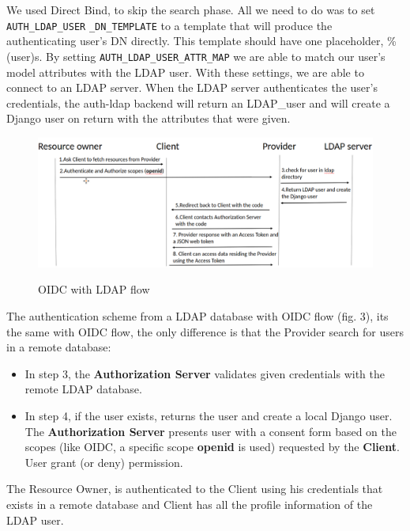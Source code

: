 We used Direct Bind, to skip the search phase. All we need to do was to set \verb|AUTH_LDAP_USER| \verb|_DN_TEMPLATE| to a template that will produce the authenticating user’s DN directly. This template should have one placeholder, \%(user)s. By setting \verb|AUTH_LDAP_USER_ATTR_MAP| we are able to match our user's model attributes with the LDAP user.
With these settings, we are able to connect to an LDAP server. When the LDAP server authenticates the user's credentials, the auth-ldap backend will return an LDAP\_user and will create a Django user on return with the attributes that were given.

\begin{figure}[htb]
	\centering
	\includegraphics[scale=0.3]{figures/LDAP.png}\\
	\caption{OIDC with LDAP flow}
\end{figure}

The authentication scheme from a LDAP database with OIDC flow (fig. 3), its the same with OIDC flow, the only difference is that the Provider search for users in a remote database:

\begin{itemize}

	
	\item In step 3, the \textbf{Authorization Server }validates given credentials with the remote LDAP database. 
	
	\item In step 4, if the user exists, returns the user and create a local Django user. The \textbf{Authorization Server} presents user with a consent form based on the scopes (like OIDC, a specific scope \textbf{openid} is used) requested by the \textbf{Client}. User grant (or deny) permission.
	
	
\end{itemize}

The Resource Owner, is authenticated to the Client using his credentials that exists in a remote database and Client has all the profile information of the LDAP user.

